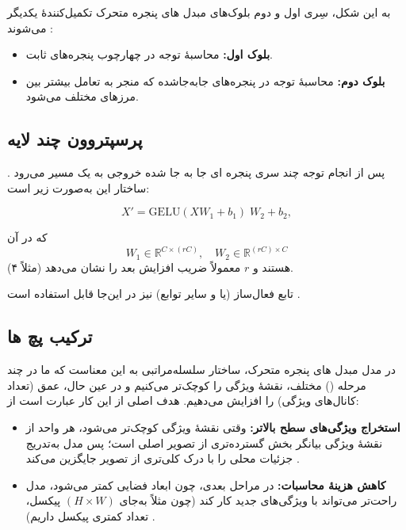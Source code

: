به این شکل، سِری اول و دوم بلوک‌های مبدل های پنجره متحرک 
تکمیل‌کنندهٔ یکدیگر می‌شوند \cite{liu2021swintransformer}:
\begin{itemize}
	\item \textbf{بلوک اول:} محاسبهٔ توجه در چهارچوب پنجره‌های ثابت.
	\item \textbf{بلوک دوم:} محاسبهٔ  توجه در پنجره‌های جابه‌جاشده که منجر به تعامل بیشتر بین مرزهای مختلف می‌شود.
\end{itemize}


\subsection{پرسپتروون چند لایه}
پس از انجام توجه چند سری پنجره ای جا  به جا شده 
خروجی به یک مسیر \textbf{} می‌رود \cite{liu2021swintransformer}. ساختار این  به‌صورت زیر است:

\begin{equation}
	X' = \mathrm{GELU}(X W_1 + b_1) \; W_2 + b_2,
	\label{eq:gelu_transform}
\end{equation}

که در آن
\[
W_1 \in \mathbb{R}^{C \times (rC)}, 
\quad
W_2 \in \mathbb{R}^{(rC) \times C}
\]
هستند و \(\displaystyle r\) معمولاً ضریب افزایش بعد را نشان می‌دهد (مثلاً ۴). 

تابع فعال‌ساز  (یا  و سایر توابع) نیز در این‌جا قابل استفاده است \cite{hendrycks2016gelu}.

\subsection{ترکیب پچ ها}
در مدل مبدل های پنجره متحرک، ساختار سلسله‌مراتبی به این معناست که ما در چند مرحله () مختلف، نقشهٔ ویژگی را کوچک‌تر می‌کنیم و در عین حال، عمق (تعداد کانال‌های ویژگی) را افزایش می‌دهیم. هدف اصلی از این کار عبارت است از:

\begin{itemize}
	\item \textbf{استخراج ویژگی‌های سطح بالاتر:}
	وقتی نقشهٔ ویژگی کوچک‌تر می‌شود، هر واحد از نقشهٔ ویژگی بیانگر بخش گسترده‌تری از تصویر اصلی است؛ 
	پس مدل به‌تدریج جزئیات محلی را با درک کلی‌تری از تصویر جایگزین می‌کند \cite{he2016deep}.
	
	\item \textbf{کاهش هزینهٔ محاسبات:}
	در مراحل بعدی، چون ابعاد فضایی کمتر می‌شود، مدل راحت‌تر می‌تواند با ویژگی‌های جدید کار کند 
	(چون مثلاً به‌جای \((H \times W)\) پیکسل، تعداد کمتری پیکسل داریم) \cite{liu2021swintransformer}.
\end{itemize}


